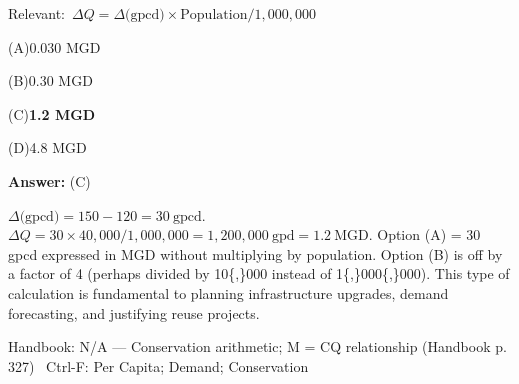 \documentclass[11pt]{article}
\newcommand{\correct}[1]{\textbf{#1}\;{\color{accent}$\checkmark$}}
\newcommand{\optline}[2]{\par\noindent\hspace{1.2em}(#1)\hspace{0.6em}#2}
\begin{document}
{\small\color{soft}Relevant:}\ $\Delta Q = \Delta\text{(gpcd)}\times\text{Population}/1{,}000{,}000$\par\vspace{3pt}
\optline{A}{0.030 MGD}
\optline{B}{0.30 MGD}
\optline{C}{\correct{1.2 MGD}}
\optline{D}{4.8 MGD}
\par\vspace{3pt}
\vspace{2pt}\par\noindent\colorbox{boxbg}{\parbox{\dimexpr\linewidth-2\fboxsep\relax}{%
\vspace{2pt}\textbf{Answer:} (C)\par\vspace{2pt}
{\small $\Delta\text{(gpcd)} = 150-120 = 30\ \mathrm{gpcd}$.  $\Delta Q = 30\times40{,}000/1{,}000{,}000 = 1{,}200{,}000\ \mathrm{gpd} = 1.2\ \mathrm{MGD}$. Option (A) = 30 gpcd expressed in MGD without multiplying by population. Option (B) is off by a factor of 4 (perhaps divided by 10\{,\}000 instead of 1\{,\}000\{,\}000). This type of calculation is fundamental to planning infrastructure upgrades, demand forecasting, and justifying reuse projects.}\par\vspace{2pt}
{\footnotesize\color{soft}Handbook: N/A --- Conservation arithmetic; M = CQ relationship (Handbook p. 327) \textbullet\ Ctrl-F: Per Capita; Demand; Conservation}\vspace{2pt}
}}
\vspace{9pt}
\end{document}
